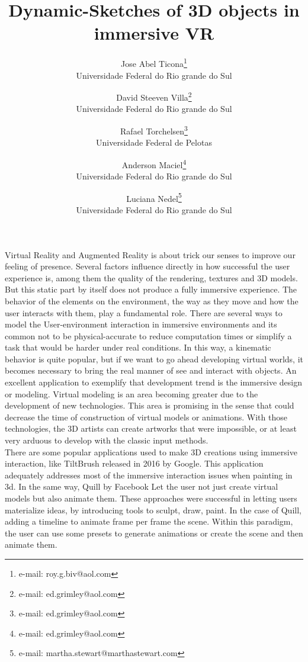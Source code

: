 \documentclass{vgtc}                          %
\title{Dynamic-Sketches of 3D objects in immersive VR}
\author{Jose Abel Ticona\thanks{e-mail: roy.g.biv@aol.com}\\ %
        \scriptsize Universidade Federal do Rio grande do Sul %
\and David Steeven Villa\thanks{e-mail: ed.grimley@aol.com}\\ %
     \scriptsize Universidade Federal do Rio grande do Sul %
\and Rafael Torchelsen\thanks{e-mail: ed.grimley@aol.com}\\ %
     \scriptsize Universidade Federal de Pelotas %
\and Anderson Maciel\thanks{e-mail: ed.grimley@aol.com}\\ %
     \scriptsize Universidade Federal do Rio grande do Sul %
\and Luciana Nedel\thanks{e-mail: martha.stewart@marthastewart.com}\\ %
	\scriptsize Universidade Federal do Rio grande do Sul %
     }
\begin{document}


\maketitle



Virtual Reality and Augmented Reality is about trick our senses to improve our feeling of presence. Several factors influence directly in how successful the user experience is, among them the quality of the rendering, textures and 3D models. But this static part by itself does not produce a fully immersive experience. The behavior of the elements on the environment, the way as they move and how the user interacts with them, play a fundamental role. There are several ways to model the User-environment interaction in immersive environments and its common not to be physical-accurate to reduce computation times or simplify a task that would be harder under real conditions. In this way, a kinematic behavior is quite popular, but if we want to go ahead developing virtual worlds, it becomes necessary to bring the real manner of see and interact with objects. An excellent application to exemplify that development trend is the immersive design or modeling. Virtual modeling is an area becoming greater due to the development of new technologies. This area is promising in the sense that could decrease the time of construction of virtual models or animations. With those technologies, the 3D artists can create artworks that were impossible, or at least very arduous to develop with the classic input methods.\\
 
There are some popular applications used to make 3D creations using immersive interaction, like TiltBrush \cite{TiltBrush} released in 2016 by Google. This application adequately addresses most of the immersive interaction issues when painting in 3d. In the same way, Quill \cite{Quill} by Facebook Let the user not just create virtual models but also animate them. These approaches were successful in letting users materialize ideas, by introducing tools to sculpt, draw, paint. In the case of Quill, adding a timeline to animate frame per frame the scene. Within this paradigm, the user can use some presets to generate animations or create the scene and then animate them.\\
\end{document}
